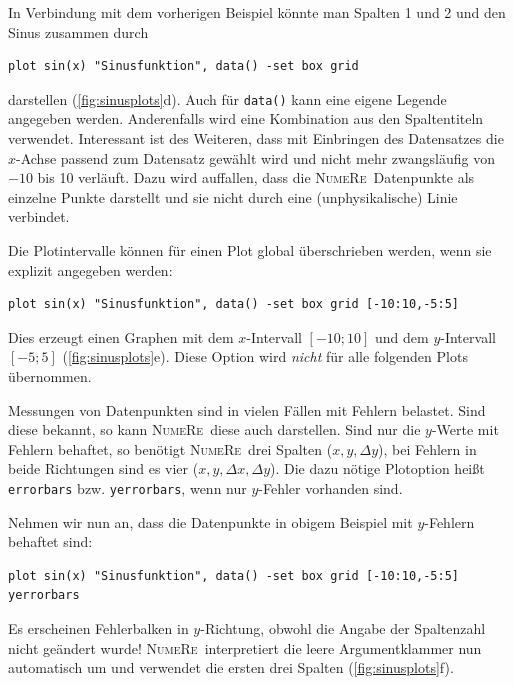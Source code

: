 \documentclass[DIV=14,headsepline,footsepline]{scrbook}
\newcommand{\NR}{\textsc{Nu\-me\-Re}}
\begin{document}
				In Verbindung mit dem vorherigen Beispiel könnte man Spalten 1 und 2 und den Sinus zusammen durch
				\begin{lstlisting}
plot sin(x) "Sinusfunktion", data() -set box grid
				\end{lstlisting}
				darstellen (\autoref{fig:sinusplots}d). Auch für \verb+data()+ kann eine eigene Legende angegeben werden. Anderenfalls wird eine Kombination aus den Spaltentiteln verwendet. Interessant ist des Weiteren, dass mit Einbringen des Datensatzes die $x$-Achse passend zum Datensatz gewählt wird und nicht mehr zwangsläufig von $-10$ bis 10 verläuft. Dazu wird auffallen, dass die \NR\ Datenpunkte als einzelne Punkte darstellt und sie nicht durch eine (unphysikalische) Linie verbindet.
				
				Die Plotintervalle können für einen Plot global überschrieben werden, wenn sie explizit angegeben werden:
				\begin{lstlisting}
plot sin(x) "Sinusfunktion", data() -set box grid [-10:10,-5:5]
				\end{lstlisting}
				Dies erzeugt einen Graphen mit dem $x$-Intervall $[-10;10]$ und dem $y$-Intervall $[-5;5]$ (\autoref{fig:sinusplots}e). Diese Option wird \emph{nicht} für alle folgenden Plots übernommen.
				
				Messungen von Datenpunkten sind in vielen Fällen mit Fehlern belastet. Sind diese bekannt, so kann \NR\ diese auch darstellen. Sind nur die $y$-Werte mit Fehlern behaftet, so benötigt \NR\ drei Spalten ($x,y,\Delta y$), bei Fehlern in beide Richtungen sind es vier ($x,y,\Delta x, \Delta y$). Die dazu nötige Plotoption heißt \verb+errorbars+ bzw. \verb+yerrorbars+, wenn nur $y$-Fehler vorhanden sind.
				
				Nehmen wir nun an, dass die Datenpunkte in obigem Beispiel mit $y$-Fehlern behaftet sind:
				\begin{lstlisting}
plot sin(x) "Sinusfunktion", data() -set box grid [-10:10,-5:5] yerrorbars
				\end{lstlisting}
				Es erscheinen Fehlerbalken in $y$-Richtung, obwohl die Angabe der Spaltenzahl nicht geändert wurde! \NR\ interpretiert die leere Argumentklammer nun automatisch um und verwendet die ersten drei Spalten (\autoref{fig:sinusplots}f).
				
\end{document}
